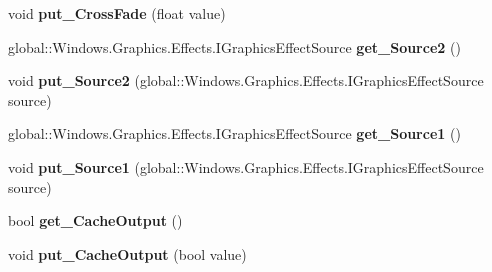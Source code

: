 \begin{DoxyCompactItemize}
\item 
\mbox{\label{class_microsoft_1_1_graphics_1_1_canvas_1_1_effects_1_1_cross_fade_effect_a1bb024927d16d9d1077994bdd49ff1b3}} 
void {\bfseries put\+\_\+\+Cross\+Fade} (float value)
\item 
\mbox{\label{class_microsoft_1_1_graphics_1_1_canvas_1_1_effects_1_1_cross_fade_effect_ae64842db8377a81fbe51b6e9c8230622}} 
global\+::\+Windows.\+Graphics.\+Effects.\+I\+Graphics\+Effect\+Source {\bfseries get\+\_\+\+Source2} ()
\item 
\mbox{\label{class_microsoft_1_1_graphics_1_1_canvas_1_1_effects_1_1_cross_fade_effect_a03f909bfef26ae588f520b5c6f561b89}} 
void {\bfseries put\+\_\+\+Source2} (global\+::\+Windows.\+Graphics.\+Effects.\+I\+Graphics\+Effect\+Source source)
\item 
\mbox{\label{class_microsoft_1_1_graphics_1_1_canvas_1_1_effects_1_1_cross_fade_effect_a515cb86c3b146b49a043c5a2f2fa0e34}} 
global\+::\+Windows.\+Graphics.\+Effects.\+I\+Graphics\+Effect\+Source {\bfseries get\+\_\+\+Source1} ()
\item 
\mbox{\label{class_microsoft_1_1_graphics_1_1_canvas_1_1_effects_1_1_cross_fade_effect_a72eb46d22afb55188148751eda6335e6}} 
void {\bfseries put\+\_\+\+Source1} (global\+::\+Windows.\+Graphics.\+Effects.\+I\+Graphics\+Effect\+Source source)
\item 
\mbox{\label{class_microsoft_1_1_graphics_1_1_canvas_1_1_effects_1_1_cross_fade_effect_a8e3589682f0d148492f35236f8ccfba7}} 
bool {\bfseries get\+\_\+\+Cache\+Output} ()
\item 
\mbox{\label{class_microsoft_1_1_graphics_1_1_canvas_1_1_effects_1_1_cross_fade_effect_a8332e6ad0fb1e1aceda5417f290ce62f}} 
void {\bfseries put\+\_\+\+Cache\+Output} (bool value)

\end{DoxyCompactItemize}
